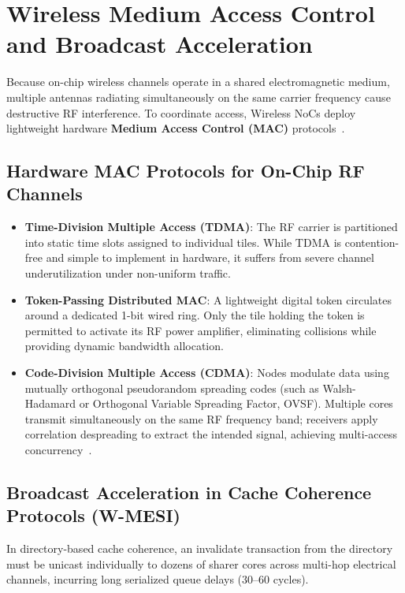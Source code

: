 \section{Wireless Medium Access Control and Broadcast Acceleration}
\label{sec:ch10_wireless_mac}

Because on-chip wireless channels operate in a shared electromagnetic medium, multiple antennas radiating simultaneously on the same carrier frequency cause destructive RF interference. To coordinate access, Wireless NoCs deploy lightweight hardware \textbf{Medium Access Control (MAC)} protocols~\cite{Deb2012,Abadal2018,Taghvaee2022}.

\subsection{Hardware MAC Protocols for On-Chip RF Channels}
\begin{itemize}
    \item \textbf{Time-Division Multiple Access (TDMA)}: The RF carrier is partitioned into static time slots assigned to individual tiles. While TDMA is contention-free and simple to implement in hardware, it suffers from severe channel underutilization under non-uniform traffic.
    \item \textbf{Token-Passing Distributed MAC}: A lightweight digital token circulates around a dedicated 1-bit wired ring. Only the tile holding the token is permitted to activate its RF power amplifier, eliminating collisions while providing dynamic bandwidth allocation.
    \item \textbf{Code-Division Multiple Access (CDMA)}: Nodes modulate data using mutually orthogonal pseudorandom spreading codes (such as Walsh-Hadamard or Orthogonal Variable Spreading Factor, OVSF). Multiple cores transmit simultaneously on the same RF frequency band; receivers apply correlation despreading to extract the intended signal, achieving multi-access concurrency~\cite{Deb2012,Abadal2018}.
\end{itemize}

\subsection{Broadcast Acceleration in Cache Coherence Protocols (W-MESI)}
In directory-based cache coherence, an invalidate transaction from the directory must be unicast individually to dozens of sharer cores across multi-hop electrical channels, incurring long serialized queue delays ($30\text{--}60$ cycles).

